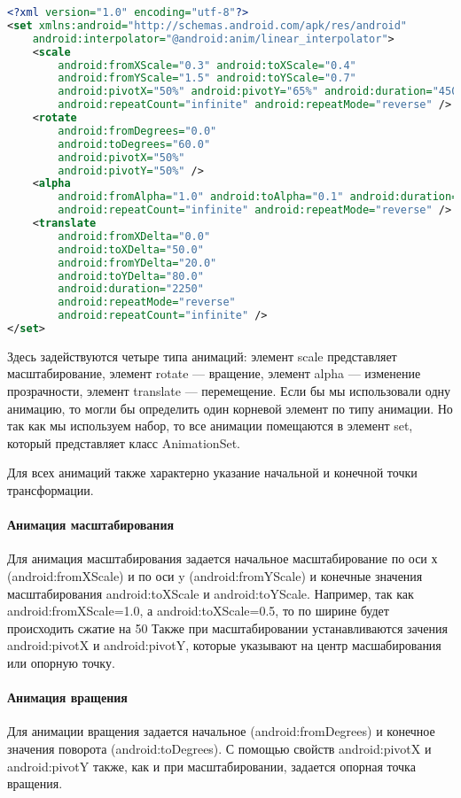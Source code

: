 \begin{lstlisting}[language=XML
	, label=lst:
	]
<?xml version="1.0" encoding="utf-8"?>
<set xmlns:android="http://schemas.android.com/apk/res/android"
    android:interpolator="@android:anim/linear_interpolator">
    <scale
        android:fromXScale="0.3" android:toXScale="0.4"
        android:fromYScale="1.5" android:toYScale="0.7"
        android:pivotX="50%" android:pivotY="65%" android:duration="4500"
        android:repeatCount="infinite" android:repeatMode="reverse" />
    <rotate
        android:fromDegrees="0.0"
        android:toDegrees="60.0"
        android:pivotX="50%"
        android:pivotY="50%" />
    <alpha
        android:fromAlpha="1.0" android:toAlpha="0.1" android:duration="2250"
        android:repeatCount="infinite" android:repeatMode="reverse" />
    <translate
        android:fromXDelta="0.0"
        android:toXDelta="50.0"
        android:fromYDelta="20.0"
        android:toYDelta="80.0"
        android:duration="2250"
        android:repeatMode="reverse"
        android:repeatCount="infinite" />
</set>
\end{lstlisting}

Здесь задействуются четыре типа анимаций: элемент scale представляет
масштабирование, элемент rotate --- вращение, элемент alpha --- изменение
прозрачности, элемент translate --- перемещение. Если бы мы использовали
одну анимацию, то могли бы определить один корневой элемент по типу
анимации. Но так как мы используем набор, то все анимации помещаются в
элемент set, который представляет класс AnimationSet.\par
Для всех анимаций также характерно указание начальной и конечной точки
трансформации.

\paragraph{Анимация масштабирования}
Для анимация масштабирования задается начальное масштабирование по оси
х (android:fromXScale) и по оси y (android:fromYScale) и конечные
значения масштабирования android:toXScale и android:toYScale. Например,
так как android:fromXScale=1.0, а android:toXScale=0.5, то по ширине будет
происходить сжатие на 50%
Также при масштабировании устанавливаются зачения android:pivotX и
android:pivotY, которые указывают на центр масшабирования или опорную
точку.

\paragraph{Анимация вращения}
Для анимации вращения задается начальное (android:fromDegrees) и
конечное значения поворота (android:toDegrees).
С помощью свойств android:pivotX и android:pivotY также, как и при
масштабировании, задается опорная точка вращения.

